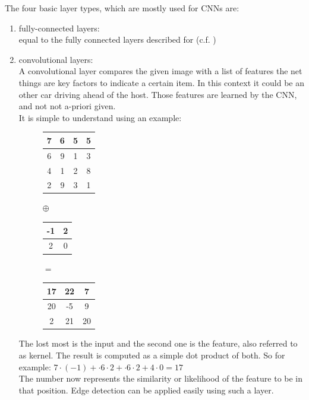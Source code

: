 The four basic layer types, which are mostly used for CNNs are:
\begin{enumerate}
\setlength{\itemindent}{-0.5cm}
\item fully-connected layers:\\
	equal to the fully connected layers described for \nns (c.f. )
\item convolutional layers:\\
	A convolutional layer compares the given image with a list of features the net things are key factors to indicate a certain item. In this context it could be an other car driving ahead of the host. Those features are learned by the CNN, and not not a-priori given. \\
	It is simple to understand using an example:\\
	\begin{figure}[H]
		\centering
		\begin{tabular}{|c|c|c|c|} \hline
			7 & 6 & 5 & 5 \\\hline
			6 & 9 & 1 & 3 \\\hline
			4 & 1 & 2 & 8 \\\hline
			2 & 9 & 3 & 1 \\\hline
		\end{tabular}
		$\oplus$
		\begin{tabular}{|c|c|} \hline
			-1 & 2 \\\hline
			2 & 0 \\\hline
		\end{tabular}
		$=$
		\begin{tabular}{|c|c|c|} \hline
			17 & 22 & 7\\\hline
			20 & -5 & 9\\\hline
			2 & 21 & 20\\\hline
		\end{tabular}
	\end{figure}
	The lost most is the input and the second one is the feature, also referred to as kernel. The result is computed as a simple dot product of both. So for example: $7\cdot(-1)+\cdot6\cdot2+\cdot6\cdot2+4\cdot0=17$\\
	The number now represents the similarity or likelihood of the feature to be in that position. Edge detection can be applied easily using such a layer. \cite{hubel1968receptive}

\end{enumerate}
